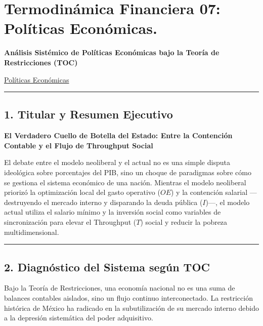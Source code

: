 \documentclass[12pt,letterpaper]{article}
\begin{document}
\hypertarget{termodinuxe1mica-financiera-07-poluxedticas-econuxf3micas.}{%
\section{Termodinámica Financiera 07: Políticas
Económicas.}\label{termodinuxe1mica-financiera-07-poluxedticas-econuxf3micas.}}

\textbf{Análisis Sistémico de Políticas Económicas bajo la Teoría de
Restricciones (TOC)}

\href{https://www.eleconomista.com.mx/economia/edgar-amador-responde-guillermo-ortiz-modelo-actual-dado-mejores-resultados-neoliberal-20260921-834537.html}{Políticas
Económicas}

\begin{center}\rule{0.5\linewidth}{0.5pt}\end{center}

\hypertarget{titular-y-resumen-ejecutivo}{%
\subsection{1. Titular y Resumen
Ejecutivo}\label{titular-y-resumen-ejecutivo}}

\textbf{El Verdadero Cuello de Botella del Estado: Entre la Contención
Contable y el Flujo de Throughput Social}

El debate entre el modelo neoliberal y el actual no es una simple
disputa ideológica sobre porcentajes del PIB, sino un choque de
paradigmas sobre cómo se gestiona el sistema económico de una nación.
Mientras el modelo neoliberal priorizó la optimización local del gasto
operativo (\(OE\)) y la contención salarial ---destruyendo el mercado
interno y disparando la deuda pública (\(I\))---, el modelo actual
utiliza el salario mínimo y la inversión social como variables de
sincronización para elevar el Throughput (\(T\)) social y reducir la
pobreza multidimensional.

\begin{center}\rule{0.5\linewidth}{0.5pt}\end{center}

\hypertarget{diagnuxf3stico-del-sistema-seguxfan-toc}{%
\subsection{2. Diagnóstico del Sistema según
TOC}\label{diagnuxf3stico-del-sistema-seguxfan-toc}}

Bajo la Teoría de Restricciones, una economía nacional no es una suma de
balances contables aislados, sino un flujo continuo interconectado. La
restricción histórica de México ha radicado en la subutilización de su
mercado interno debido a la depresión sistemática del poder adquisitivo.
\end{document}
